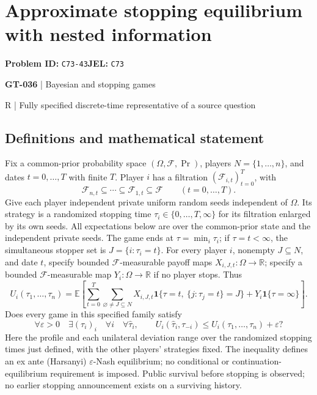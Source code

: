 \documentclass[11pt,a4paper]{article}
\newcommand{\R}{\mathbb R}
\begin{document}
\section*{Approximate stopping equilibrium with nested information}
\textbf{Problem ID:} \texttt{C73-43}\quad \textbf{JEL:} \texttt{C73}\par
\label{problem:OP-0166}
\label{game:GT-036}
{\sffamily\small\color{muted}
{\sffamily\small\color{muted}\textbf{GT-036} | Bayesian and stopping games\par R | Fully specified discrete-time representative of a source question\par}
\par}
\subsection*{Definitions and mathematical statement}
Fix a common-prior probability space $(\Omega,\mathcal F,\Pr)$, players $N=\{1,\ldots,n\}$, and dates $t=0,\ldots,T$ with finite $T$. Player $i$ has a filtration $(\mathcal F_{i,t})_{t=0}^{T}$, with
\[
 \mathcal F_{n,t}\subseteq\cdots\subseteq\mathcal F_{1,t}\subseteq\mathcal F
 \qquad(t=0,\ldots,T).
\]
Give each player independent private uniform random seeds independent of $\Omega$. Its strategy is a randomized stopping time $\tau_i\in\{0,\ldots,T,\infty\}$ for its filtration enlarged by its own seeds. All expectations below are over the common-prior state and the independent private seeds. The game ends at $\tau=\min_i\tau_i$; if $\tau=t<\infty$, the simultaneous stopper set is $J=\{i:\tau_i=t\}$. For every player $i$, nonempty $J\subseteq N$, and date $t$, specify bounded $\mathcal F$-measurable payoff maps $X_{i,J,t}:\Omega\to\R$; specify a bounded $\mathcal F$-measurable map $Y_i:\Omega\to\R$ if no player stops. Thus
\[
 U_i(\tau_1,\ldots,\tau_n)
 =\mathbb E\!\left[\sum_{t=0}^{T}\sum_{\varnothing\ne J\subseteq N}
 X_{i,J,t}\mathbf1\{\tau=t,\ \{j:\tau_j=t\}=J\}
 +Y_i\mathbf1\{\tau=\infty\}\right].
\]
Does every game in this specified family satisfy
\[
 \forall\varepsilon>0\quad\exists(\tau_i)_i\quad\forall i\quad\forall\widehat\tau_i,
 \qquad U_i(\widehat\tau_i,\tau_{-i})\leq U_i(\tau_1,\ldots,\tau_n)+\varepsilon?
\]
Here the profile and each unilateral deviation range over the randomized stopping times just defined, with the other players' strategies fixed. The inequality defines an ex ante (Harsanyi) $\varepsilon$-Nash equilibrium; no conditional or continuation-equilibrium requirement is imposed. Public survival before stopping is observed; no earlier stopping announcement exists on a surviving history.
\end{document}
